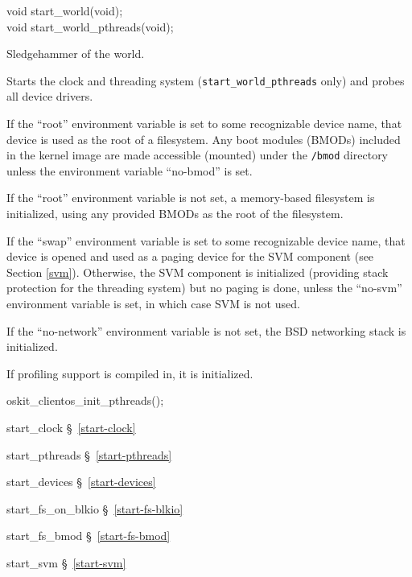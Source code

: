 \label{start-world}
\begin{apisyn}

	\funcproto void start_world(void); \\
	\funcproto void start_world_pthreads(void);
\end{apisyn}
\begin{apidesc}
	Sledgehammer of the \oskit{} world.

	Starts the clock
	and threading system (\texttt{start_world_pthreads} only)
	and probes all device drivers.

	If the ``root'' environment variable is set to some recognizable
	device name, that device is used as the root of a filesystem.
	Any boot modules (BMODs) included in the kernel image are made
	accessible (mounted) under the \texttt{/bmod} directory unless the
	environment variable ``no-bmod'' is set.

	If the ``root'' environment variable is not set,
	a memory-based filesystem is initialized, using any provided
	BMODs as the root of the filesystem.

	If the ``swap'' environment variable is set to some recognizable
	device name, that device is opened and used as a paging device for
	the SVM component (see Section \ref{svm}).
	Otherwise, the SVM component is initialized (providing stack
	protection for the threading system) but no paging is done,
	unless the ``no-svm'' environment variable is set, in which case
	SVM is not used.

	If the ``no-network'' environment variable is not set, the BSD
	networking stack is initialized.

	If profiling support is compiled in, it is initialized.

	oskit_clientos_init_pthreads();

\end{apidesc}
\begin{apidep}
	\item[start_clock]	\S~\ref{start-clock}
	\item[start_pthreads]	\S~\ref{start-pthreads}
	\item[start_devices]	\S~\ref{start-devices}
	\item[start_fs_on_blkio]	\S~\ref{start-fs-blkio}
	\item[start_fs_bmod]	\S~\ref{start-fs-bmod}
	\item[start_svm]	\S~\ref{start-svm}
\end{apidep}

